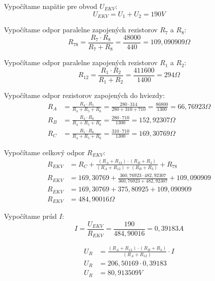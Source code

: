 \documentclass[a4paper,11pt,titlepage]{article}
\begin{document}
Vypočítame napätie pre obvod $U_{EKV}$:
\[U_{EKV} = U_1 + U_2 = 190 V\]

\vspace{5mm}

Vypočítame odpor paralelne zapojených rezistorov $R_7$ a $R_8$:
\[R_{78} = \frac{R_7 \cdot R_8}{R_7 + R_8} = \frac{48000}{440} = 109,090909 \Omega\]

\vspace{5mm}

Vypočítame odpor paralelne zapojených rezistorov $R_1$ a $R_2$:
\[
R_{12} = \frac{R_1 \cdot R_2}{R_1 + R_2} = \frac{411600}{1400} = 294 \Omega
\]

\vspace{5mm}

Vypočítame odpor rezistorov zapojených do hviezdy:
\begin{align*}
R_A &= \frac{R_4 \cdot R_5}{R_4 + R_5 + R_6} = \frac{280 \cdot 314}{280 + 310 + 710} = \frac{86800}{1300} = 66,76923 \Omega \\[10pt]
R_B &= \frac{R_4 \cdot R_6}{R_4 + R_5 + R_6} = \frac{280 \cdot 710}{1300} = 152,92307 \Omega \\[10pt]
R_C &= \frac{R_5 \cdot R_6}{R_4 + R_5 + R_6} = \frac{310 \cdot 710}{1300} = 169,30769 \Omega 
\end{align*}

\vspace{5mm}

Vypočítame celkový odpor $R_{EKV}$:
\begin{align*}
R_{EKV} &= R_C + \frac{(R_A + R_{12}) \cdot (R_B + R_3)}{(R_A + R_{12}) + (R_B + R_3)} + R_{78} \\[10pt]
R_{EKV} &= 169,30769 + \frac{360,76923 \cdot 482,92307}{360,76923 + 482,92307} + 109,090909 \\[10pt]
R_{EKV} &= 169,30769 + 375,80925 + 109,090909 \\[10pt]
R_{EKV} &= 484,90016 \Omega 
\end{align*}

\vspace{5mm}

Vypočítame prúd $I$:
\[
I = \frac{U_{EKV}}{R_{EKV}} = \frac{190}{484,90016} = 0,39183A
\]

\vspace{5mm}

\begin{align*}
U_R &= \frac{(R_A + R_{12}) \cdot (R_B + R_3)}{(R_A + R_{12})} \cdot I \\[10pt]
U_R &= 206,50169 \cdot 0,39183 \\[10pt]
U_R &= 80,913509V
\end{align*}
\end{document}
